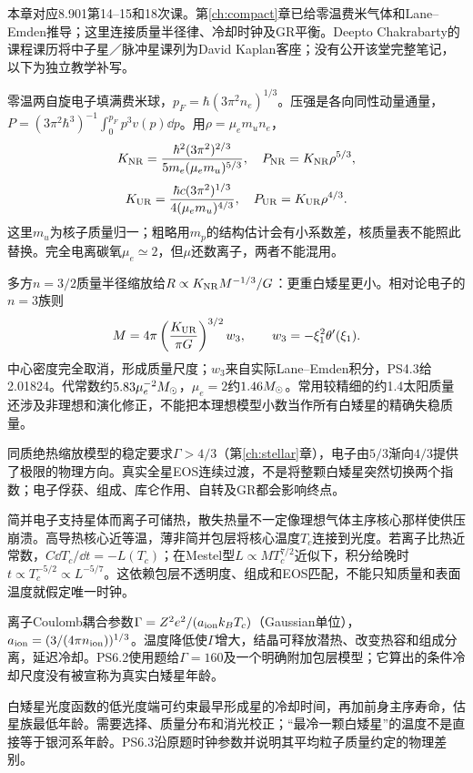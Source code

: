 本章对应8.901第14--15和18次课。第\ref{ch:compact}章已给零温费米气体和Lane--Emden推导；这里连接质量半径律、冷却时钟及GR平衡。Deepto Chakrabarty的课程课历将中子星／脉冲星课列为David Kaplan客座；没有公开该堂完整笔记，以下为独立教学补写。

零温两自旋电子填满费米球，$p_F=\hbar(3\pi^2n_e)^{1/3}$。压强是各向同性动量通量，$P=(3\pi^2\hbar^3)^{-1}\int_0^{p_F}p^3v(p)\dd p$。用$\rho=\mu_em_un_e$，
\[
 K_{\rm NR}=\frac{\hbar^2(3\pi^2)^{2/3}}{5m_e(\mu_em_u)^{5/3}},
 \quad P_{\rm NR}=K_{\rm NR}\rho^{5/3},
\]
\[
 K_{\rm UR}=\frac{\hbar c(3\pi^2)^{1/3}}{4(\mu_em_u)^{4/3}},
 \quad P_{\rm UR}=K_{\rm UR}\rho^{4/3}.
\]
这里$m_u$为核子质量归一；粗略用$m_p$的结构估计会有小系数差，核质量表不能照此替换。完全电离碳氧$\mu_e\simeq2$，但$\mu$还数离子，两者不能混用。

多方$n=3/2$质量半径缩放给$R\propto K_{\rm NR}M^{-1/3}/G$：更重白矮星更小。相对论电子的$n=3$族则
\[
 M=4\pi\left(\frac{K_{\rm UR}}{\pi G}\right)^{3/2}w_3,\qquad
 w_3=-\xi_1^2\theta'(\xi_1).
\]
中心密度完全取消，形成质量尺度；$w_3$来自实际Lane--Emden积分，PS4.3给2.01824。代常数约$5.83\mu_e^{-2}M_{\odot}$，$\mu_e=2$约$1.46M_{\odot}$。常用较精细的约1.4太阳质量还涉及非理想和演化修正，不能把本理想模型小数当作所有白矮星的精确失稳质量。

同质绝热缩放模型的稳定要求$\Gamma>4/3$（第\ref{ch:stellar}章），电子由$5/3$渐向$4/3$提供了极限的物理方向。真实全星EOS连续过渡，不是将整颗白矮星突然切换两个指数；电子俘获、组成、库仑作用、自转及GR都会影响终点。

简并电子支持星体而离子可储热，散失热量不一定像理想气体主序核心那样使供压崩溃。高导热核心近等温，薄非简并包层将核心温度$T_c$连接到光度。若离子比热近常数，$C\dd T_c/\dd t=-L(T_c)$；在Mestel型$L\propto MT_c^{7/2}$近似下，积分给晚时$t\propto T_c^{-5/2}\propto L^{-5/7}$。这依赖包层不透明度、组成和EOS匹配，不能只知质量和表面温度就假定唯一时钟。

离子Coulomb耦合参数$\Gamma=Z^2e^2/(a_{\rm ion}k_BT_c)$（Gaussian单位），$a_{\rm ion}=(3/(4\pi n_{\rm ion}))^{1/3}$。温度降低使$\Gamma$增大，结晶可释放潜热、改变热容和组成分离，延迟冷却。PS6.2使用题给$\Gamma=160$及一个明确附加包层模型；它算出的条件冷却尺度没有被宣称为真实白矮星年龄。

白矮星光度函数的低光度端可约束最早形成星的冷却时间，再加前身主序寿命，估星族最低年龄。需要选择、质量分布和消光校正；“最冷一颗白矮星”的温度不是直接等于银河系年龄。PS6.3沿原题时钟参数并说明其平均粒子质量约定的物理差别。

